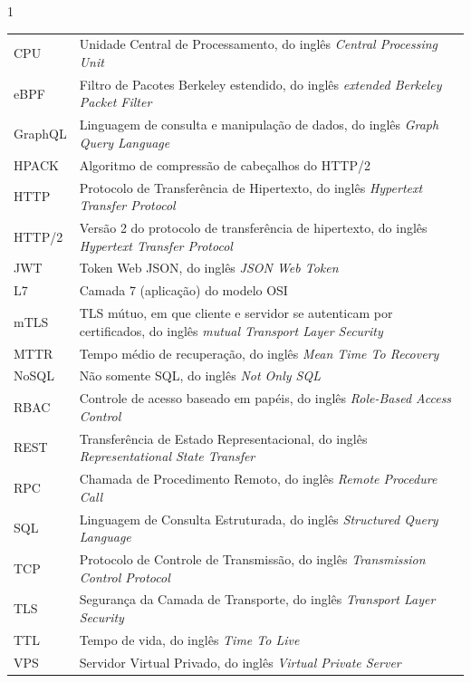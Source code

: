 
\listadeabrevsiglaseacr%

\begin{Spacing}{1}
  \noindent
  \begin{tabular}{@{}p{25mm}@{}p{135mm}@{}}
    CPU     & Unidade Central de Processamento, do inglês \textit{Central Processing Unit} \\
    eBPF    & Filtro de Pacotes Berkeley estendido, do inglês \textit{extended Berkeley Packet Filter} \\
    GraphQL & Linguagem de consulta e manipulação de dados, do inglês \textit{Graph Query Language} \\
    HPACK   & Algoritmo de compressão de cabeçalhos do HTTP/2 \\
    HTTP    & Protocolo de Transferência de Hipertexto, do inglês \textit{Hypertext Transfer Protocol} \\
    HTTP/2  & Versão 2 do protocolo de transferência de hipertexto, do inglês \textit{Hypertext
    Transfer Protocol} \\
    JWT     & Token Web JSON, do inglês \textit{JSON Web Token} \\
    L7      & Camada 7 (aplicação) do modelo OSI \\
    mTLS    & TLS mútuo, em que cliente e servidor se autenticam por certificados, do inglês
    \textit{mutual Transport Layer Security} \\
    MTTR    & Tempo médio de recuperação, do inglês \textit{Mean Time To Recovery} \\
    NoSQL   & Não somente SQL, do inglês \textit{Not Only SQL} \\
    RBAC    & Controle de acesso baseado em papéis, do inglês \textit{Role-Based Access Control} \\
    REST    & Transferência de Estado Representacional, do inglês \textit{Representational State Transfer} \\
    RPC     & Chamada de Procedimento Remoto, do inglês \textit{Remote Procedure Call} \\
    SQL     & Linguagem de Consulta Estruturada, do inglês \textit{Structured Query Language} \\
    TCP     & Protocolo de Controle de Transmissão, do inglês \textit{Transmission Control Protocol} \\
    TLS     & Segurança da Camada de Transporte, do inglês \textit{Transport Layer Security} \\
    TTL     & Tempo de vida, do inglês \textit{Time To Live} \\
    VPS     & Servidor Virtual Privado, do inglês \textit{Virtual Private Server} \\
  \end{tabular}
\end{Spacing}
